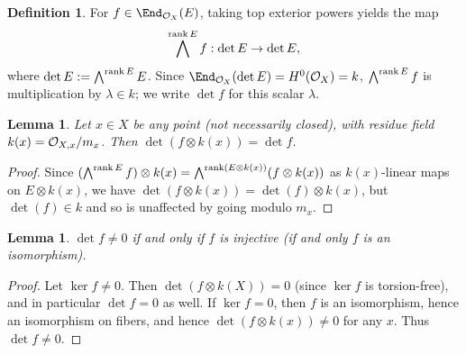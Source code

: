 \documentclass[12pt]{article}
\let\l\lambda
\theoremstyle{theorem}
\numberwithin{thm}{section}
\newtheorem{lem}[thm]{Lemma}
\theoremstyle{definition}
\newtheorem{dfn}[thm]{Definition}
\begin{document}

\begin{dfn}
For $f\in \End_{\O_X}(E)$, taking top exterior powers yields the map
$$ \bigwedge^{\operatorname{rank} E} f: \det E  \to \det E, $$
where $\det E := \bigwedge^{\operatorname{rank} E} E$.
Since $\End_{\O_X}(\det E) = H^0(\O_X)=k$, $\bigwedge^{\operatorname{rank} E} f$ is multiplication by $\l\in k$; we write $\det f$ for this scalar $\l$.
\end{dfn}

\begin{lem}
Let $x \in X$ be any point (not necessarily closed), with residue field $k(x) = \mathcal O_{X,x}/m_x$. Then $\det(f\otimes k(x)) =\det f$.
\end{lem}

\begin{proof}
Since $(\bigwedge^{\operatorname{rank} E} f)\otimes k(x) = \bigwedge^{\operatorname{rank}( E\otimes k(x))}( f\otimes k(x))$ as $k(x)$-linear maps on $E\otimes k(x)$,
 we have $\det(f\otimes k(x)) =\det(f)\otimes k(x)$, but $\det(f)\in k$ and so is unaffected by going modulo $m_x$.
\end{proof}



\begin{lem}
$\det f \neq 0 $ if and only if $f$ is injective (if and only $f$ is an isomorphism).
\end{lem}

\begin{proof}
  Let $\ker f \neq 0$. %
 Then $\det(f\otimes k(X))= 0$ (since $\ker f$ is torsion-free), and in particular  $\det f = 0$ as well.
If $\ker f = 0$, then
$f$ is an isomorphism, hence an isomorphism on fibers, and hence
$\det(f\otimes k(x)) \neq 0$ for any $x$. Thus $\det f\neq 0$.
\end{proof}
\end{document}
